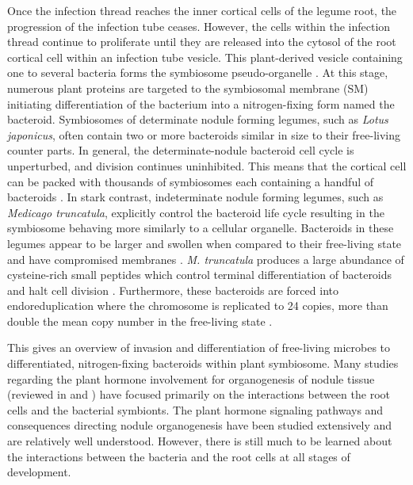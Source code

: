Once the infection thread reaches the inner cortical cells of the legume root,
the progression of the infection tube ceases. However, the cells within the
infection thread continue to proliferate until they are released into the
cytosol of the root cortical cell within an infection tube vesicle. This
plant-derived vesicle containing one to several bacteria forms the
symbiosome pseudo-organelle \cite{Oldroyd:2011ej}. At this stage, numerous plant
proteins are targeted to the symbiosomal membrane (SM) initiating
differentiation of the bacterium into a nitrogen-fixing form named the bacteroid.  
Symbiosomes of determinate nodule forming legumes, such as \textit{Lotus japonicus}, 
often contain two or more bacteroids similar in size to their
free-living counter parts. In general, the determinate-nodule bacteroid cell
cycle is unperturbed, and division continues uninhibited. This means that the
cortical cell can be packed with thousands of symbiosomes each containing a
handful of bacteroids \cite{Ott:2009vx}. In stark contrast, 
indeterminate nodule forming legumes, such as \textit{Medicago truncatula},
explicitly control the bacteroid life cycle resulting in the symbiosome 
behaving more similarly to a cellular organelle. Bacteroids in these legumes
appear to be larger and swollen when compared to their free-living state 
\cite{Oono:2010hg} and have compromised membranes \cite{Mergaert:2006wi}. \textit{M. truncatula} produces a large abundance of
cysteine-rich small peptides which control terminal
differentiation of bacteroids and halt cell division \cite{VandeVelde:2010cn,
Farkas:2014dv}. Furthermore, these bacteroids are forced into endoreduplication
where the chromosome is replicated to 24 copies, more than double the mean copy
number in the free-living state \cite{Mergaert:2006wi}.

This gives an overview of invasion and differentiation of free-living microbes to
differentiated, nitrogen-fixing bacteroids within plant symbiosome. Many studies
regarding the plant hormone involvement for organogenesis of nodule tissue
(reviewed in \citet{Oldroyd:2004dv} and \citet{Ryu:2012dt}) have focused
primarily on the interactions between the root cells and the bacterial
symbionts. The plant hormone signaling pathways and consequences directing
nodule organogenesis have been studied extensively and are relatively well
understood. However, there is still much to be learned about the interactions
between the bacteria and the root cells at all stages of development.  

